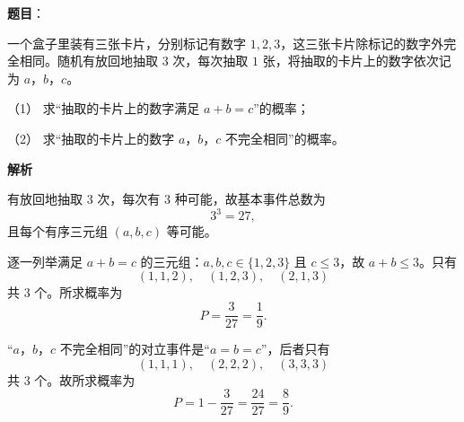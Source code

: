 \begin{answer}

\textbf{题目}：

一个盒子里装有三张卡片，分别标记有数字 $1,2,3$，这三张卡片除标记的数字外完全相同。随机有放回地抽取 $3$ 次，每次抽取 $1$ 张，将抽取的卡片上的数字依次记为 $a$，$b$，$c$。

（1） 求“抽取的卡片上的数字满足 $a+b=c$”的概率；

（2） 求“抽取的卡片上的数字 $a$，$b$，$c$ 不完全相同”的概率。

\textbf{解析}

有放回地抽取 $3$ 次，每次有 $3$ 种可能，故基本事件总数为
\nopagebreak[4]
\[3^3=27,\]
且每个有序三元组 $(a,b,c)$ 等可能。


逐一列举满足 $a+b=c$ 的三元组：$a,b,c\in\{1,2,3\}$ 且 $c\leqslant 3$，故 $a+b\leqslant 3$。只有
\nopagebreak[4]
\[(1,1,2),\quad(1,2,3),\quad(2,1,3)\]
共 $3$ 个。所求概率为
\nopagebreak[4]
\[P=\frac3{27}=\frac19 .\]


“$a$，$b$，$c$ 不完全相同”的对立事件是“$a=b=c$”，后者只有
\nopagebreak[4]
\[(1,1,1),\quad(2,2,2),\quad(3,3,3)\]
共 $3$ 个。故所求概率为
\nopagebreak[4]
\[P=1-\frac3{27}=\frac{24}{27}=\frac89 .\]



\end{answer}
